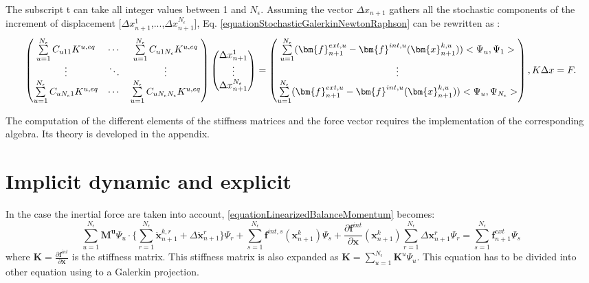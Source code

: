 \documentclass[oneside,11pt,times]{book}
\begin{document}
The subscript t can take all integer values between 1 and $N_{\epsilon}$. Assuming the vector \textit{$\Delta{x_{n+1}}$} gathers all the stochastic components of the increment of displacement [$\Delta{x^{1}_{n+1}}$,...,$\Delta{x^{N_{\epsilon}}_{n+1}}$], Eq. \ref{equationStochasticGalerkinNewtonRaphson} can be rewritten as :
\begin{equation}
\label{equationStochasticGalerkinNewtonRaphsonFinalSystem}
\begin{pmatrix}
    \sum\limits_{u=1}^{N_{\epsilon}} C_{u11} {K}^{u,eq}     & \cdots & \sum\limits_{u=1}^{N_{\epsilon}} C_{u1N_{\epsilon}} {K}^{u,eq} \\
    \vdots & \ddots & \vdots \\
    \sum\limits_{u=1}^{N_{\epsilon}} C_{uN_{\epsilon}1} {K}^{u,eq}      & \cdots & \sum\limits_{u=1}^{N_{\epsilon}} C_{uN_{\epsilon}N_{\epsilon}} {K}^{u,eq}
\end{pmatrix}
\begin{pmatrix}
\Delta{x^{1}_{n+1}} \\
\vdots \\
\Delta{x^{N_{\epsilon}}_{n+1}}
\end{pmatrix}
= \begin{pmatrix}
\sum\limits_{u=1}^{N_{\epsilon}} (\bm{f}^{ext,u}_{n+1} - \bm{f}^{int,u}(\bm{x}^{k,u}_{n+1})) <\Psi_u,\Psi_1> \\
\vdots \\
\sum\limits_{u=1}^{N_{\epsilon}} (\bm{f}^{ext,u}_{n+1} - \bm{f}^{int,u}(\bm{x}^{k,u}_{n+1})) <\Psi_u,\Psi_{N_{\epsilon}}>
\end{pmatrix},\\
K\Delta{x}=F.
\end{equation}

The computation of the different elements of the stiffness matrices and the force vector requires the implementation of the corresponding algebra. Its theory is developed in the appendix.
\section{Implicit dynamic and explicit}
In the case the inertial force are taken into account, \eqref{equationLinearizedBalanceMomentum} becomes:
\begin{equation} \label{equationLinearizedBalanceMomentum}
 \sum\limits_{u=1}^{N_{\epsilon}}\bm{M^{u}}\Psi_u \cdot \{\sum\limits_{r=1}^{N_{\epsilon}}\ddot{\bm{x}}^{k,r}_{n+1} + \Delta \ddot{\bm{x}}^{r}_{n+1}\}\Psi_r + \sum\limits_{s=1}^{N_{\epsilon}}\bm{f}^{int,s}
 (\bm{x}^{k}_{n+1})\Psi_s + \frac{\partial \bm{f}^{int}}{\partial \bm{x}}(\bm{x}^{k}_{n+1})
 \sum\limits_{r=1}^{N_{\epsilon}}\Delta \bm{x}^{r}_{n+1}\Psi_r  = \sum\limits_{s=1}^{N_{\epsilon}}\bm{f}^{ext}_{n+1}\Psi_s
\end{equation}
where $\bm{K} = \frac{\partial \bm{f}^{int}}{\partial \bm{x}}$ is the stiffness matrix. This stiffness matrix is also expanded as  $\bm{K} = \sum\limits_{u=1}^{N_{\epsilon}}\bm{K}^{u}\Psi_u$. This equation has to be divided into other equation using to a Galerkin projection.
\end{document}
